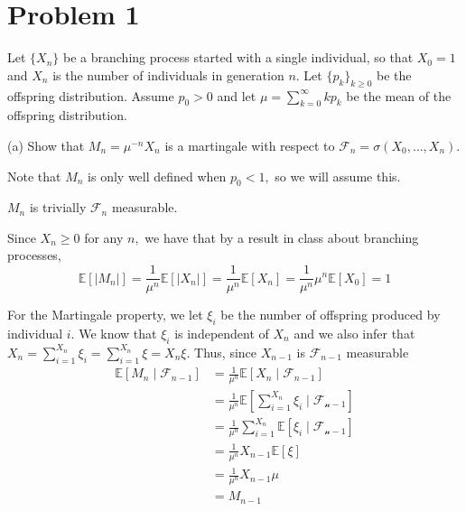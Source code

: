 \documentclass[11pt]{article}
\newcommand{\bbE}{\mathbb{E}}
\begin{document}
	
	
	\psetheader
\section*{Problem 1}
Let \(\{X_n\}\) be a branching process started with a single individual, so that \(X_0 = 1\) and \(X_n\) is the number of individuals in generation \(n\). Let \(\{p_k\}_{k \geq 0}\) be the offspring distribution. Assume \(p_0 > 0\) and let \(\mu = \sum_{k=0}^\infty k p_k\) be the mean of the offspring distribution.

(a) Show that \(M_n = \mu^{-n} X_n\) is a martingale with respect to \(\mathcal{F}_n = \sigma(X_0, \ldots, X_n)\).
\begin{solution}
Note that $M_n$ is only well defined when $p_0 <1,$ so we will assume this. 

    $M_n$ is trivially $\mathcal{F}_n$ measurable. 

    Since $X_n \geq 0$ for any $n,$ we have that by a result in class about branching processes,
    \[\bbE[|M_n|] = \frac{1}{\mu^n}\bbE[|X_n|] =\frac{1}{\mu^n}\bbE[X_n]= \frac{1}{\mu^n}\mu^n \bbE[X_0] = 1  \]

    For the Martingale property, we let $\xi_i$ be the number of offspring produced by  individual $i$. We know that $\xi_i$ is independent of $X_n$ and we also infer that $X_{n} = \sum_{i=1}^{X_n}\xi_i = \sum_{i=1}^{X_n}\xi = X_n\xi.$ Thus, since $X_{n-1}$ is $\mathcal{F}_{n-1}$ measurable
    \begin{align*}
        \bbE[M_n \mid \mathcal{F}_{n-1}] &= \frac{1}{\mu^n}\bbE[X_n \mid \mathcal{F}_{n-1}]\\
        &= \frac{1}{\mu^n}\bbE[\sum_{i=1}^{X_n}\xi_i \mid \mathcal{F_{n-1}}]\\
        &=\frac{1}{\mu^n}\sum_{i=1}^{X_n}\bbE[\xi_i \mid \mathcal{F_{n-1}}]\\
        &= \frac{1}{\mu^n}X_{n-1} \bbE[\xi]\\
        &= \frac{1}{\mu^n}X_{n-1} \mu\\
        &= M_{n-1}
    \end{align*}
\end{solution}
\end{document}
